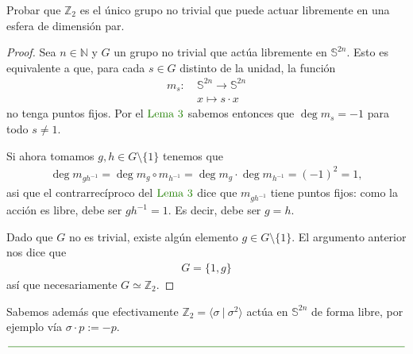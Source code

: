 \documentclass[11pt]{article}
\newcommand{\N}{\mathbb{N}}
\newcommand{\Z}{\mathbb{Z}}
\newcommand{\Ss}{\mathbb{S}}
\newcommand{\paint}[1]{\color{color}{#1}}
\newenvironment{exercise}[2][Ejercicio]{\begin{trivlist}
\item[\hskip \labelsep \paint{{\bfseries #1}}\hskip \labelsep {\bfseries #2.}]}{\end{trivlist}}
\newenvironment{obs}[2][Observaci\'on]{\begin{trivlist}
\item[\hskip \labelsep \paint{{\bfseries #1}}.]}{\end{trivlist}}
\begin{document}
\begin{exercise}{1} Probar que $\Z_2$ es el \'unico grupo no trivial que puede actuar libremente en una esfera de dimensi\'on par.
\end{exercise}
\begin{proof} Sea $n \in \N$ y $G$ un grupo no trivial que act\'ua libremente en $\Ss^{2n}$. Esto es equivalente a que, para cada $s \in G$ distinto de la unidad, la funci\'on 
\begin{align*}
m_s : \ & \Ss^{2n} \rightarrow \Ss^{2n}\\
&x \longmapsto s \cdot x
\end{align*}
no tenga puntos fijos. Por el $\paint{\text{Lema $3$}}$ sabemos entonces que $\deg m_s = -1$ para todo $s \neq 1$. 

Si ahora tomamos $g,h \in G \setminus \{1\}$ tenemos que
\begin{align*}
\deg m_{gh^{-1}} = \deg m_g \circ m_{h^{-1}} = \deg m_g \cdot \deg m_{h^{-1}} = (-1)^2 = 1,
\end{align*}
asi que el contrarrec\'iproco del $\paint{\text{Lema $3$}}$ dice que $m_{gh^{-1}}$ tiene puntos fijos: como la acci\'on es libre, debe ser $gh^{-1} = 1$. Es decir, debe ser $g = h$.

Dado que $G$ no es trivial, existe alg\'un elemento $g \in G \setminus \{1\}$. El argumento anterior nos dice que
\begin{align*}
G = \{1,g\}
\end{align*}
así que necesariamente $G \simeq \Z_2$.
\end{proof}

\begin{obs}{} Sabemos además que efectivamente $\Z_2 =  {\langle \sigma \ | \ \sigma^2 \rangle}$ actúa en $\Ss^{2n}$ de forma libre, por ejemplo vía $\sigma \cdot p := -p$.
\end{obs}

\begin{center}
$\paint{
\rule{400pt}{0.5pt}
}$
\vspace{10pt}
\end{center}
\end{document}
